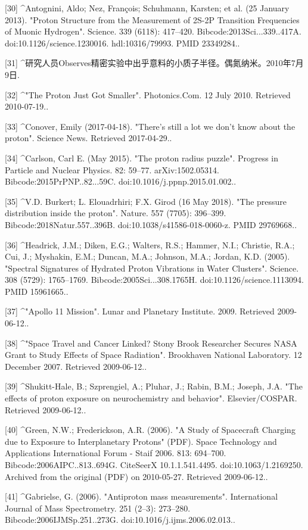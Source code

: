 [30]
^Antognini, Aldo; Nez, François; Schuhmann, Karsten; et al. (25 January 2013). "Proton Structure from the Measurement of 2S-2P Transition Frequencies of Muonic Hydrogen". Science. 339 (6118): 417–420. Bibcode:2013Sci...339..417A. doi:10.1126/science.1230016. hdl:10316/79993. PMID 23349284..

[31]
^研究人员Observes精密实验中出乎意料的小质子半径。偶氮纳米。2010年7月9日.

[32]
^"The Proton Just Got Smaller". Photonics.Com. 12 July 2010. Retrieved 2010-07-19..

[33]
^Conover, Emily (2017-04-18). "There's still a lot we don't know about the proton". Science News. Retrieved 2017-04-29..

[34]
^Carlson, Carl E. (May 2015). "The proton radius puzzle". Progress in Particle and Nuclear Physics. 82: 59–77. arXiv:1502.05314. Bibcode:2015PrPNP..82...59C. doi:10.1016/j.ppnp.2015.01.002..

[35]
^V.D. Burkert; L. Elouadrhiri; F.X. Girod (16 May 2018). "The pressure distribution inside the proton". Nature. 557 (7705): 396–399. Bibcode:2018Natur.557..396B. doi:10.1038/s41586-018-0060-z. PMID 29769668..

[36]
^Headrick, J.M.; Diken, E.G.; Walters, R.S.; Hammer, N.I.; Christie, R.A.; Cui, J.; Myshakin, E.M.; Duncan, M.A.; Johnson, M.A.; Jordan, K.D. (2005). "Spectral Signatures of Hydrated Proton Vibrations in Water Clusters". Science. 308 (5729): 1765–1769. Bibcode:2005Sci...308.1765H. doi:10.1126/science.1113094. PMID 15961665..

[37]
^"Apollo 11 Mission". Lunar and Planetary Institute. 2009. Retrieved 2009-06-12..

[38]
^"Space Travel and Cancer Linked? Stony Brook Researcher Secures NASA Grant to Study Effects of Space Radiation". Brookhaven National Laboratory. 12 December 2007. Retrieved 2009-06-12..

[39]
^Shukitt-Hale, B.; Szprengiel, A.; Pluhar, J.; Rabin, B.M.; Joseph, J.A. "The effects of proton exposure on neurochemistry and behavior". Elsevier/COSPAR. Retrieved 2009-06-12..

[40]
^Green, N.W.; Frederickson, A.R. (2006). "A Study of Spacecraft Charging due to Exposure to Interplanetary Protons" (PDF). Space Technology and Applications International Forum - Staif 2006. 813: 694–700. Bibcode:2006AIPC..813..694G. CiteSeerX 10.1.1.541.4495. doi:10.1063/1.2169250. Archived from the original (PDF) on 2010-05-27. Retrieved 2009-06-12..

[41]
^Gabrielse, G. (2006). "Antiproton mass measurements". International Journal of Mass Spectrometry. 251 (2–3): 273–280. Bibcode:2006IJMSp.251..273G. doi:10.1016/j.ijms.2006.02.013..